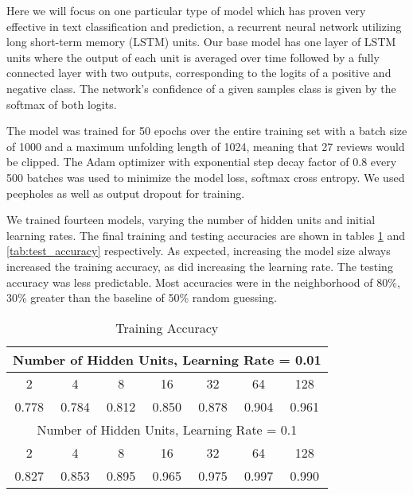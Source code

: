 Here we will focus on one particular type of model which has proven very effective in text classification and prediction, a recurrent neural network utilizing long short-term memory (LSTM) units.  Our base model has one layer of LSTM units where the output of each unit is averaged over time followed by a fully connected layer with two outputs, corresponding to the logits of a positive and negative class.  The network's confidence of a given samples class is given by the softmax of both logits.  

The model was trained for 50 epochs over the entire training set with a batch size of 1000 and a maximum unfolding length of 1024, meaning that 27 reviews would be clipped.  The Adam optimizer with exponential step decay factor of 0.8 every 500 batches was used to minimize the model loss, softmax cross entropy.  We used peepholes as well as output dropout for training.  

We trained fourteen models, varying the number of hidden units and initial learning rates.  The final training and testing accuracies are shown in tables \ref{tab:train_accuracy} and \ref{tab:test_accuracy} respectively.  As expected, increasing the model size always increased the training accuracy, as did increasing the learning rate.  The testing accuracy was less predictable.  Most accuracies were in the neighborhood of 80\%, 30\% greater than the baseline of 50\% random guessing.

\begin{table}
\centering
\begin{tabular}{ |c|c|c|c|c|c|c|}
    \hline
    \multicolumn{7}{|c|}{Number of Hidden Units, Learning Rate = 0.01}\\ \hline
    2 & 4 & 8 & 16 & 32 & 64 & 128 \\ \hline
    0.778 & 0.784 & 0.812 & 0.850 & 0.878 & 0.904 & 0.961 \\ \hline
    \multicolumn{7}{|c|}{Number of Hidden Units, Learning Rate = 0.1}\\ \hline
    2 & 4 & 8 & 16 & 32 & 64 & 128 \\ \hline
    0.827 & 0.853 & 0.895 & 0.965 & 0.975 & 0.997 & 0.990 \\ \hline
\end{tabular}
\caption{Training Accuracy}
\label{tab:train_accuracy}
\end{table}

